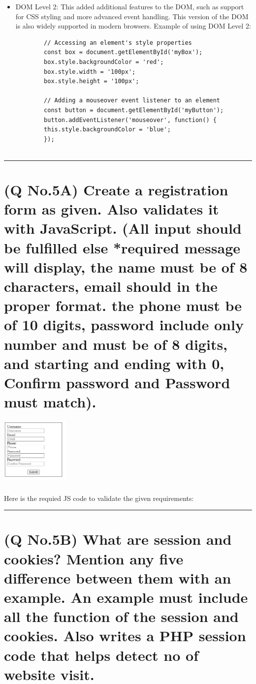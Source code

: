 \documentclass[11pt]{article}
\begin{document}
\begin{itemize}
\begin{lstlisting}
    \end{lstlisting}
    
    \item DOM Level 2: This added additional features to the DOM, such as support for CSS styling and more advanced event handling. This version of the DOM is also widely supported in modern browsers.
    Example of using DOM Level 2:
    \begin{lstlisting}
        // Accessing an element's style properties
        const box = document.getElementById('myBox');
        box.style.backgroundColor = 'red';
        box.style.width = '100px';
        box.style.height = '100px';
    
        // Adding a mouseover event listener to an element
        const button = document.getElementById('myButton');
        button.addEventListener('mouseover', function() {
        this.style.backgroundColor = 'blue';
        });
    
    \end{lstlisting}
\end{itemize}


\noindent\rule{\linewidth}{0.4pt}
\section{(Q No.5A) Create a registration form as given. Also validates it with JavaScript. (All input should be fulfilled else *required message will display, the name must be of 8 characters, email should in the proper format. the phone must be of 10 digits, password include only number and must be of 8 digits, and starting and ending with 0, Confirm password and Password must match).}
\includegraphics[width=0.25\textwidth]{resources/qno5a.PNG}
\subparagraph{}
Here is the requied JS code to validate the given requirements:




\noindent\rule{\linewidth}{0.4pt}
\section{(Q No.5B) What are session and cookies? Mention any five difference between them with an example. An example must include all the function of the session and cookies. Also writes a PHP session code that helps detect no of website visit.}
\subparagraph{}
\end{document}
